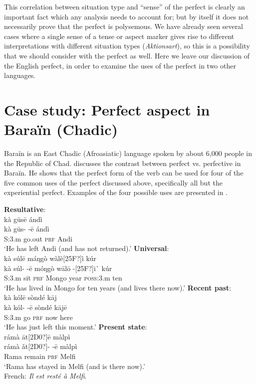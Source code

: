 This correlation between situation type and “sense” of the perfect is clearly an important fact which any analysis needs to account for; but by itself it does not necessarily prove that the perfect is polysemous. We have already seen several cases where a single sense of a tense or aspect marker gives rise to different interpretations with different situation types (\textit{Aktionsart}), so this is a possibility that we should consider with the perfect as well. Here we leave our discussion of the English perfect, in order to examine the uses of the perfect in two other languages.


\section{Case study: Perfect aspect in Baraïn (Chadic)}\label{sec:} %

Baraïn is an East Chadic (Afroasiatic) language spoken by about 6,000 people in the Republic of Chad. \citet{Lovestrand2012} discusses the contrast between perfect vs. perfective in Baraïn. He shows that the perfect form of the verb can be used for four of the five common uses of the perfect discussed above, specifically all but the experiential perfect. Examples of the four possible uses are presented in .


\ea
\ea  \textbf{Resultative}:\\
\glll kà  gūsē    ándì\\
kà  gūs-  -ē  ándì\\
S:3.m  go.out  \textsc{prf}  Andi\\
\glt ‘He has left Andi (and has not returned).’
\ex   \textbf{Universal}:\\
\glll kà  súlē    máŋgò  wàlè[25F?]ì    kúr\\
kà  súl-  -ē  móŋgò  wālō  -[25F?]i\`{}   kúr\\
S:3.m  sit  \textsc{prf}  Mongo  year  \textsc{poss}:3.m  ten\\
\glt ‘He has lived in Mongo for ten years (and lives there now).’
\ex   \textbf{Recent past}:\\
\glll kà  kólē    sòndé  kāj\\
kà  kól-  -ē  sòndé  kājē\\
S:3.m  go  \textsc{prf}  now  here\\
\glt ‘He has just left this moment.’
\ex   \textbf{Present state}:\\
\glll rámà  āt[2D0?]ē    màlpì\\
rámà  ǎt[2D0?]-  -ē  màlpì\\
Rama  remain  \textsc{prf}  Melfi\\
\glt ‘Rama has stayed in Melfi (and is there now).’\\
French: \textit{Il est resté à Melfi}.
\z \z


